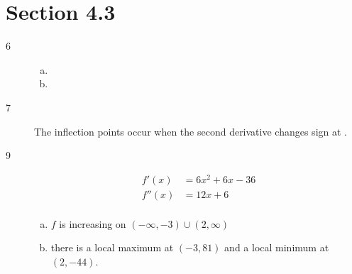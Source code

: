\documentclass[letterpaper, landscape]{exam}
\begin{document}
  \newpage

  \section{Section 4.3} %
  
  \begin{description}

    \item[6] 

      \begin{enumerate}[(a)]
        \item 
          
        \item 
      \end{enumerate}

    \item[7] The inflection points occur when the second derivative changes sign at 
      .

    \newpage

    \item[9]

      \begin{align*}
        f'(x)  & = 6x^2 + 6x - 36 \\
        f''(x) & = 12x + 6 \\
      \end{align*}

      \begin{enumerate}[(a)]
        \item $f$ is increasing on $(-\infty, -3) \cup (2, \infty)$

        \item there is a local maximum at $(-3, 81)$ and a local minimum at
          $(2, -44)$.


\end{enumerate}
\end{description}
\end{document}
